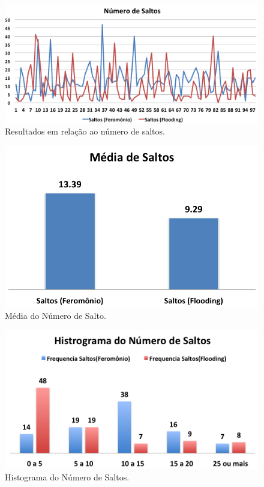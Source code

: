  \begin{figure}[h!]
 \centering
 \includegraphics[width=13cm]{results/hops.png}
 \caption{Resultados em relação ao número de saltos.}
  \label{fig:hops}
 \end{figure}


 \begin{figure}[h!]
 \centering
 \includegraphics{results/hops_mean.png}
 \caption{Média do Número de Salto.}
  \label{fig:hops_mean}
 \end{figure}

\begin{figure}[h!]
 \centering
 \includegraphics[width=13cm]{results/hops_hist.png}
 \caption{Histograma do Número de Saltos.}
  \label{fig:hops_hist}
 \end{figure}

